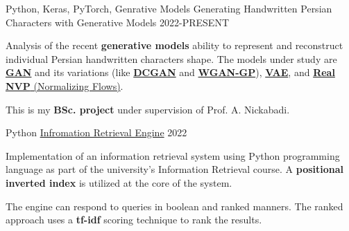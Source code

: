 

\begin{cventries}

  \cventry
    {Python, Keras, PyTorch, Genrative Models} %
    {Generating Handwritten Persian Characters with Generative Models} %
    {} %
    {2022-PRESENT} %
    {
      \begin{cvitems} %
      	\item {Analysis of the recent \textbf{generative models} ability to represent and reconstruct individual Persian handwritten characters shape. The models under study are \href{https://arxiv.org/abs/1406.2661}{\textbf{GAN}} and its variations (like \href{https://arxiv.org/abs/1511.06434}{\textbf{DCGAN}} and \href{https://arxiv.org/abs/1704.00028}{\textbf{WGAN-GP}}), \href{https://arxiv.org/abs/1312.6114}{\textbf{VAE}}, and \href{https://arxiv.org/abs/1605.08803}{\textbf{Real NVP} (Normalizing Flows)}.}
      	\item {This is my \textbf{BSc. project} under supervision of Prof. A. Nickabadi.}
      \end{cvitems}
    }

  \cventry
    {Python} %
    {\href{https://github.com/radinshayanfar/AUT-IR}{Infromation Retrieval Engine}} %
    {} %
    {2022} %
    {
      \begin{cvitems} %
      	\item {Implementation of an information retrieval system using Python programming language as part of the university's Information Retrieval course. A \textbf{positional inverted index} is utilized at the core of the system.}
      	\item {The engine can respond to queries in boolean and ranked manners. The ranked approach uses a \textbf{tf-idf} scoring technique to rank the results.}
      \end{cvitems}
    }
    

\end{cventries}
